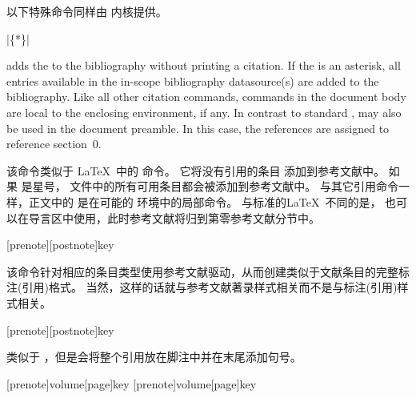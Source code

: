 
以下特殊命令同样由 \biblatex 内核提供。

\begin{ltxsyntax}

|\{*\}|

adds the  to the bibliography without printing a citation. If the
 is an asterisk, all entries available in the in-scope bibliography datasource(s) are added to the bibliography. Like all other citation commands,  commands in the document body are local to the enclosing  environment, if any. In contrast to standard \latex,  may also be used in the document preamble. In this case, the references are assigned to reference section~0.

该命令类似于 \LaTeX\ 中的  命令。
它将没有引用的条目  添加到参考文献中。
如果  是星号， 文件中的所有可用条目都会被添加到参考文献中。
与其它引用命令一样，正文中的  是在可能的  环境中的局部命令。
与标准的\LaTeX\ 不同的是， 也可以在导言区中使用，此时参考文献将归到第零参考文献分节中。

[prenote][postnote]{key}


该命令针对相应的条目类型使用参考文献驱动，从而创建类似于文献条目的完整标注(引用)格式。
当然，这样的话就与参考文献著录样式相关而不是与标注(引用)样式相关。

[prenote][postnote]{key}


类似于 ，但是会将整个引用放在脚注中并在末尾添加句号。

[prenote]{volume}[page]{key}
[prenote]{volume}[page]{key}



\end{ltxsyntax}
